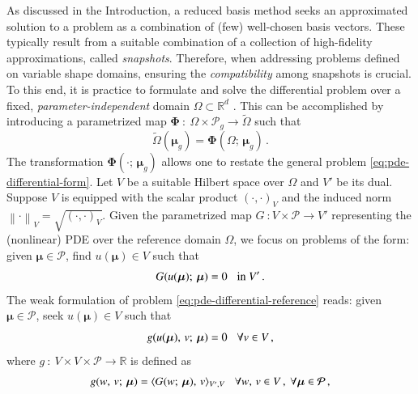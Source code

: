 \documentclass[longtitle]{elsarticle}
\numberwithin{equation}{section}
\theoremstyle{theorem}
\theoremstyle{definition}
\theoremstyle{remark}
\theoremstyle{proposition}
\numberwithin{figure}{section}
\newcommand{\norm}[1]{\left\lVert#1\right\rVert}
\newcommand{\wt}[1]{\widetilde{#1}}
\newcommand{\bg}[1]{\boldsymbol{#1}}
\begin{document}
		As discussed in the Introduction, a reduced basis method seeks an approximated solution to a problem as a combination of (few) well-chosen basis vectors. These typically result from a suitable combination of a collection of high-fidelity approximations, called \emph{snapshots}. Therefore, when addressing problems defined on variable shape domains, ensuring the \emph{compatibility} among snapshots is crucial. To this end, it is practice to formulate and solve the differential problem over a fixed, \emph{parameter-independent} domain $\Omega \subset \mathbb{R}^d$ \cite{MN16}. This can be accomplished by introducing a parametrized map $\bg{\Phi} ~ : ~ \Omega \times \mathcal{P}_g \rightarrow \wt{\Omega}$ such that
		\begin{equation*}
			\label{eq:parametrized-map}
			\wt{\Omega}(\bg{\mu}_g) = \bg{\Phi}(\Omega; \, \bg{\mu}_g) \, .
		\end{equation*}
		The transformation $\bg{\Phi}(\cdot; \, \bg{\mu}_g)$ allows one to restate the general problem \eqref{eq:pde-differential-form}. Let $V$ be a suitable Hilbert space over $\Omega$ and $V'$ be its dual. Suppose $V$ is equipped with the scalar product $(\cdot, \cdot)_V$ and the induced norm $\norm{\cdot}_V = \sqrt{(\cdot, \cdot)_V}$. Given the parametrized map $G ~ : V \times \mathcal{P} \rightarrow V'$ representing the (nonlinear) PDE over the reference domain $\Omega$, we focus on problems of the form: given $\bg{\mu} \in \mathcal{P}$, find $u(\bg{\mu}) \in V$ such that
		\begin{equation}
			\label{eq:pde-differential-reference}
			G(u(\bg{\mu}); \, \bg{\mu}) = 0 \hspace*{0.3cm} \text{in $V'$} \, .
		\end{equation}
		The weak formulation of problem \eqref{eq:pde-differential-reference} reads: given $\bg{\mu} \in \mathcal{P}$, seek $u(\bg{\mu}) \in V$ such that
		\begin{equation}
			\label{eq:pde-weak-reference}
			g(u(\bg{\mu}), \, v; \, \bg{\mu}) = 0 \hspace*{0.3cm} \forall v \in V \, ,
		\end{equation}
		where $g ~ : ~ V \times V \times \mathcal{P} \rightarrow \mathbb{R}$ is defined as
		\begin{equation*}
			g(w, \, v; \, \bg{\mu}) = \langle G(w; \, \bg{\mu}), \, v \rangle_{V',V} \hspace*{0.3cm} \forall w, \, v \in V \, , ~ \forall \bg{\mu} \in \mathcal{P} \, ,
		\end{equation*}
\end{document}
